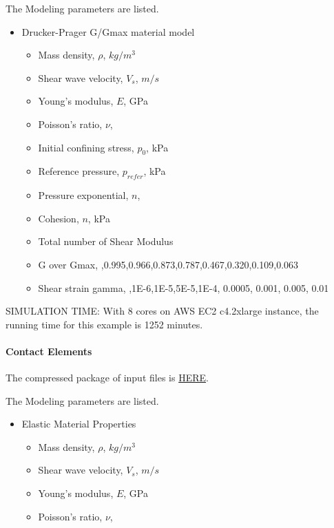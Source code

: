The Modeling parameters are listed.
\begin{itemize}
  \item Drucker-Prager G/Gmax material model 
  \begin{itemize}
    \item Mass density, $\rho$, \enspace {} $kg/m^3$
    \item Shear wave velocity, $V_s$, \enspace {} $m/s$
    \item Young's modulus, $E$, \enspace {} GPa
    \item Poisson's ratio, $\nu$, \enspace {}
    \item Initial confining stress, $p_0$, \enspace {} kPa
    \item Reference pressure, $p_{refer} $, \enspace {} kPa
    \item Pressure exponential, $ n  $, \enspace {}
    \item Cohesion, $ n  $, \enspace {} kPa
    \item Total number of Shear Modulus \enspace {}
    \item G over Gmax, \enspace {},0.995,0.966,0.873,0.787,0.467,0.320,0.109,0.063
    \item Shear strain gamma, \enspace {},1E-6,1E-5,5E-5,1E-4, 0.0005, 0.001, 0.005, 0.01
  \end{itemize}
\end{itemize}

SIMULATION TIME: With 8 cores on AWS EC2 c4.2xlarge instance, the running time for this example is 1252 minutes.


\paragraph{Contact Elements}
The compressed package of input files is  
\href{http://sokocalo.engr.ucdavis.edu/~jeremic/lecture_notes_online_material/_Chapter_Short_Course_Examples/nonlinear_analysis_steps/soil-foundation/contact/_all_files_packaged_for_contact.tar.gz}{HERE}. 


The Modeling parameters are listed.
\begin{itemize}
  \item Elastic Material Properties 
  \begin{itemize}
    \item Mass density, $\rho$, \enspace {} $kg/m^3$
    \item Shear wave velocity, $V_s$, \enspace {} $m/s$
    \item Young's modulus, $E$, \enspace {} GPa
    \item Poisson's ratio, $\nu$, \enspace {}
  \end{itemize}
\end{itemize}

